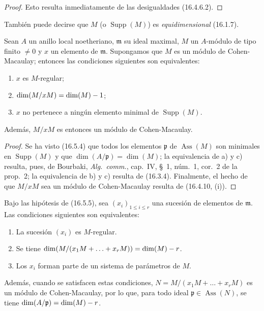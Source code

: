 \begin{proof}
Esto resulta inmediatamente de las desigualdades (16.4.6.2).
\end{proof}

También puede decirse que $M$ (o $\operatorname{Supp}(M)$) es
\emph{equidimensional} (16.1.7).


\begin{proposition}[16.5.5]
\label{0.16.5.5-fr}
Sean $A$ un anillo local noetheriano, $\mathfrak{m}$ su ideal maximal, $M$
un $A$-módulo de tipo finito $\neq0$ y $x$ un elemento de $\mathfrak{m}$.
Supongamos que $M$ es un módulo de Cohen-Macaulay; entonces las condiciones
siguientes son equivalentes:
\begin{enumerate}
  \item[\textup{a)}] $x$ es $M$-regular;
  \item[\textup{b)}] $\dim(M/xM)=\dim(M)- 1$;
  \item[\textup{c)}] $x$ no pertenece a ningún elemento minimal de
  $\operatorname{Supp}(M)$.
\end{enumerate}
Además, $M/xM$ es entonces un módulo de Cohen-Macaulay.
\end{proposition}

\begin{proof}
Se ha visto (16.5.4) que todos los elementos $\mathfrak{p}$ de
$\operatorname{Ass}(M)$ son minimales en $\operatorname{Supp}(M)$ y que
$\dim(A/\mathfrak{p})=\dim(M)$; la equivalencia de a) y c) resulta, pues, de
Bourbaki, \emph{Alg.~comm.}, cap.~IV, \S~1, núm.~1, cor.~2 de la prop.~2;
la equivalencia de b) y c) resulta de (16.3.4). Finalmente, el hecho de que
$M/xM$ sea un módulo de Cohen-Macaulay resulta de (16.4.10, (i)).
\end{proof}

\begin{corollary}[16.5.6]
\label{0.16.5.6-fr}
Bajo las hipótesis de \textup{(16.5.5)}, sea $(x_i)_{1\leq i\leq r}$ una sucesión
de elementos de $\mathfrak{m}$. Las condiciones siguientes son equivalentes:
\begin{enumerate}
  \item[\textup{a)}] La sucesión $(x_i)$ es $M$-regular.
  \item[\textup{b)}] Se tiene
  $\dim(M/(x_1M+\ldots+x_rM))=\dim(M)- r$.
  \item[\textup{c)}] Los $x_i$ forman parte de un sistema de parámetros de $M$.
\end{enumerate}
Además, cuando se satisfacen estas condiciones,
$N=M/(x_1M+\ldots+x_rM)$ es un módulo de Cohen-Macaulay, por lo que, para todo
ideal $\mathfrak{p}\in\operatorname{Ass}(N)$, se tiene
$\dim(A/\mathfrak{p})=\dim(M)- r$.
\end{corollary}

